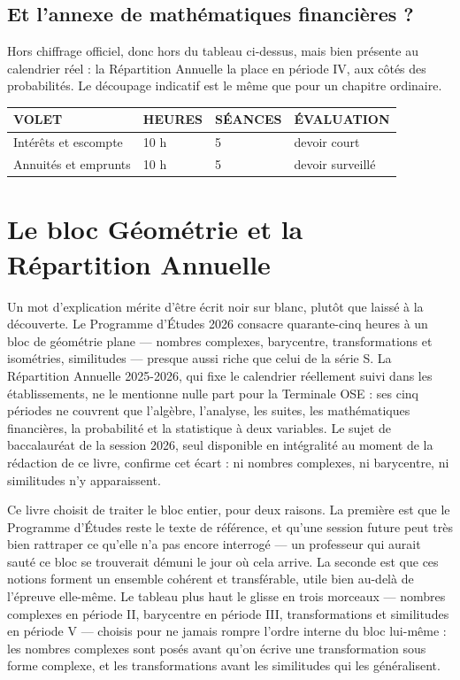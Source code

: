 \subsection*{Et l'annexe de mathématiques financières ?}

Hors chiffrage officiel, donc hors du tableau ci-dessus, mais bien présente
au calendrier réel : la Répartition Annuelle la place en période IV, aux
côtés des probabilités. Le découpage indicatif est le même que pour un
chapitre ordinaire.

\vspace{0.5em}
\begin{center}
\setlength{\tabcolsep}{6pt}
\renewcommand{\arraystretch}{1.35}
\begin{tabular}{@{}L{6.0cm} L{1.5cm} L{1.7cm} L{2.1cm}@{}}
\toprule
\textsf{\footnotesize\bfseries VOLET} &
\textsf{\footnotesize\bfseries HEURES} &
\textsf{\footnotesize\bfseries SÉANCES} &
\textsf{\footnotesize\bfseries ÉVALUATION} \\
\midrule
Intérêts et escompte    & 10 h & 5 & devoir court \\
Annuités et emprunts    & 10 h & 5 & devoir surveillé \\
\bottomrule
\end{tabular}
\end{center}

\section*{Le bloc Géométrie et la Répartition Annuelle}

Un mot d'explication mérite d'être écrit noir sur blanc, plutôt que laissé à
la découverte. Le Programme d'Études 2026 consacre quarante-cinq heures à un
bloc de géométrie plane — nombres complexes, barycentre, transformations et
isométries, similitudes — presque aussi riche que celui de la série S. La
Répartition Annuelle 2025-2026, qui fixe le calendrier réellement suivi dans
les établissements, ne le mentionne nulle part pour la Terminale OSE : ses
cinq périodes ne couvrent que l'algèbre, l'analyse, les suites, les
mathématiques financières, la probabilité et la statistique à deux
variables. Le sujet de baccalauréat de la session 2026, seul disponible en
intégralité au moment de la rédaction de ce livre, confirme cet écart : ni
nombres complexes, ni barycentre, ni similitudes n'y apparaissent.

Ce livre choisit de traiter le bloc entier, pour deux raisons. La première
est que le Programme d'Études reste le texte de référence, et qu'une session
future peut très bien rattraper ce qu'elle n'a pas encore interrogé — un
professeur qui aurait sauté ce bloc se trouverait démuni le jour où cela
arrive. La seconde est que ces notions forment un ensemble cohérent et
transférable, utile bien au-delà de l'épreuve elle-même. Le tableau plus
haut le glisse en trois morceaux — nombres complexes en période II,
barycentre en période III, transformations et similitudes en période V —
choisis pour ne jamais rompre l'ordre interne du bloc lui-même : les
nombres complexes sont posés avant qu'on écrive une transformation sous
forme complexe, et les transformations avant les similitudes qui les
généralisent.

